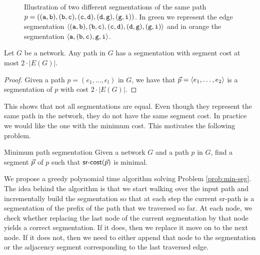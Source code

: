 \begin{figure}[H]
\begin{center}
\end{center}
\caption{Illustration of two different segmentations of the same path $p = ((\texttt{a}, \texttt{b}), (\texttt{b}, \texttt{c}), (\texttt{c}, \texttt{d}), (\texttt{d}, \texttt{g}), (\texttt{g}, \texttt{i}))$. In green
we represent the edge segmentation $\langle (\texttt{a}, \texttt{b}), (\texttt{b}, \texttt{c}), (\texttt{c}, \texttt{d}), (\texttt{d}, \texttt{g}), (\texttt{g}, \texttt{i}) \rangle$ and in orange the segmentation
$\langle \texttt{a}, (\texttt{b}, \texttt{c}), \texttt{g}, \texttt{i} \rangle$.}
\label{fig:min-seg-example}
\end{figure}

\begin{lemma}
\label{lemma:edgeseg}
Let $G$ be a network. Any path in $G$ has a segmentation with segment cost at most $2 \cdot |E(G)|$. 
\end{lemma}

\begin{proof}
Given a path $p = (e_1, \ldots, e_l)$ in $G$, we have that $\vec{p} = \langle e_1, \ldots, e_2 \rangle$ is a segmentation of
$p$ with cost $2 \cdot |E(G)|$.
\end{proof}


This shows that not all segmentations are equal. Even though they represent the same path in the network,
they do not have the same segment cost. In practice we would like the one with the minimum cost. This motivates
the following problem.

\begin{problem}{Minimum path segmentation}
\label{prob:min-seg}
Given a network $G$ and a path $p$ in $G$, find a segment $\vec{p}$ of $p$ such that $\textsf{sr-cost}(\vec{p})$ is minimal.
\end{problem}

We propose a greedy polynomial time algorithm solving Problem \ref{prob:min-seg}. The idea behind the algorithm is that we start walking over the input path and incrementally build the segmentation so that
at each step the current sr-path is a segmentation of the prefix of the path that we traversed so far. At each node, we check whether 
replacing the last node of the current segmentation by that node yields a correct segmentation. 
If it does, then we replace it move on to the next node. If it does not, then we need to either append that node to
the segmentation or the adjacency segment corresponding to the last traversed edge.

